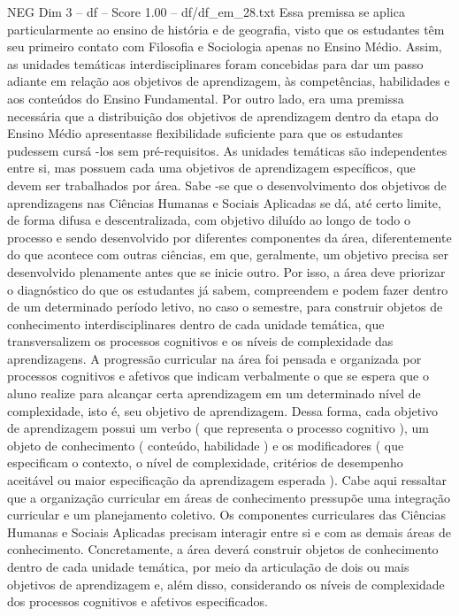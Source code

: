 \begin{textsample}{NEG Dim 3 – df – Score 1.00 – df/df\_em\_28.txt}
Essa premissa se aplica particularmente ao ensino de história e de geografia, visto que os estudantes têm seu primeiro contato com Filosofia e Sociologia apenas no Ensino Médio.
Assim, as unidades temáticas interdisciplinares foram concebidas para dar um passo adiante em relação aos objetivos de aprendizagem, às competências, habilidades e aos conteúdos do Ensino Fundamental.
Por outro lado, era uma premissa necessária que a distribuição dos objetivos de aprendizagem dentro da etapa do Ensino Médio apresentasse flexibilidade suficiente para que os estudantes pudessem cursá -los sem pré-requisitos.
As unidades temáticas são independentes entre si, mas possuem cada uma objetivos de aprendizagem específicos, que devem ser trabalhados por área.
Sabe -se que o desenvolvimento dos objetivos de aprendizagens nas Ciências Humanas e Sociais Aplicadas se dá, até certo limite, de forma difusa e descentralizada, com objetivo diluído ao longo de todo o processo e sendo desenvolvido por diferentes componentes da área, diferentemente do que acontece com outras ciências, em que, geralmente, um objetivo precisa ser desenvolvido plenamente antes que se inicie outro.
Por isso, a área deve priorizar o diagnóstico do que os estudantes já sabem, compreendem e podem fazer dentro de um determinado período letivo, no caso o semestre, para construir objetos de conhecimento interdisciplinares dentro de cada unidade temática, que transversalizem os processos cognitivos e os níveis de complexidade das aprendizagens.
A progressão curricular na área foi pensada e organizada por processos cognitivos e afetivos que indicam verbalmente o que se espera que o aluno realize para alcançar certa aprendizagem em um determinado nível de complexidade, isto é, seu objetivo de aprendizagem.
Dessa forma, cada objetivo de aprendizagem possui um verbo ( que representa o processo cognitivo ), um objeto de conhecimento ( conteúdo, habilidade ) e os modificadores ( que especificam o contexto, o nível de complexidade, critérios de desempenho aceitável ou maior especificação da aprendizagem esperada ).
Cabe aqui ressaltar que a organização curricular em áreas de conhecimento pressupõe uma integração curricular e um planejamento coletivo.
Os componentes curriculares das Ciências Humanas e Sociais Aplicadas precisam interagir entre si e com as demais áreas de conhecimento.
Concretamente, a área deverá construir objetos de conhecimento dentro de cada unidade temática, por meio da articulação de dois ou mais objetivos de aprendizagem e, além disso, considerando os níveis de complexidade dos processos cognitivos e afetivos especificados.

\end{textsample}

